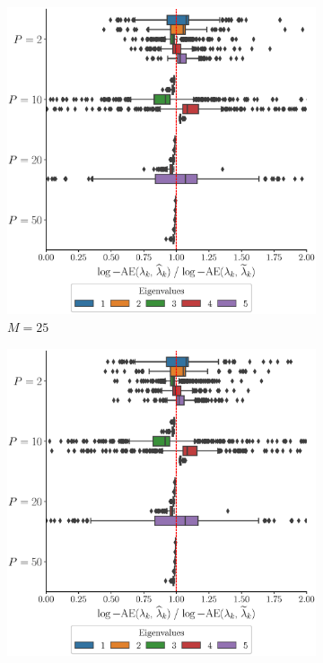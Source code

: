 \begin{results}

\begin{figure}
     \centering
     \begin{subfigure}[b]{0.49\textwidth}
         \centering
         \includegraphics[width=\textwidth]{figures/scenario_1/logAE_N50_M25.eps}
         \caption{$M = 25$}
         \label{fig:logAE_mfd_1d_25}
     \end{subfigure}
     \hfill
     \begin{subfigure}[b]{0.49\textwidth}
         \centering
         \includegraphics[width=\textwidth]{figures/scenario_1/logAE_N50_M50.eps}

\end{subfigure}
\end{figure}
\end{results}
